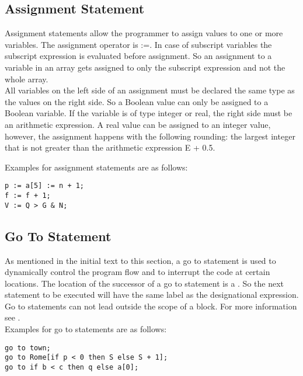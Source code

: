 \documentclass{article}
\begin{document}
\subsection{Assignment Statement} \label{assigStat}
Assignment statements allow the programmer to assign values to one or more variables. The assignment operator is :=. In case of subscript variables the subscript expression is evaluated before assignment. So an assignment to a variable in an array gets assigned to only the subscript expression and not the whole array. \\
All variables on the left side of an assignment must be declared the same type as the values on the right side. So a Boolean value can only be assigned to a Boolean variable. If the variable is of type integer or real, the right side must be an arithmetic expression. A real value can be assigned to an integer value, however, the assignment happens with the following rounding: the largest integer that is not greater than the arithmetic expression E + 0.5.

Examples for assignment statements are as follows:\\ 
\begin{lstlisting}[language={[60]algol}]
p := a[5] := n + 1;
f := f + 1;
V := Q > G & N;
\end{lstlisting}

\subsection{Go To Statement}
As mentioned in the initial text to this section, a go to statement is used to dynamically control the program flow and to interrupt the code at certain locations. The location of the successor of a go to statement is a . So the next statement to be executed will have the same label as the designational expression.\\
Go to statements can not lead outside the scope of a block. For more information see .\\

Examples for go to statements are as follows:\\ 
\begin{lstlisting}[language={[60]algol}]
go to town;
go to Rome[if p < 0 then S else S + 1];
go to if b < c then q else a[0];
\end{lstlisting}
\end{document}
